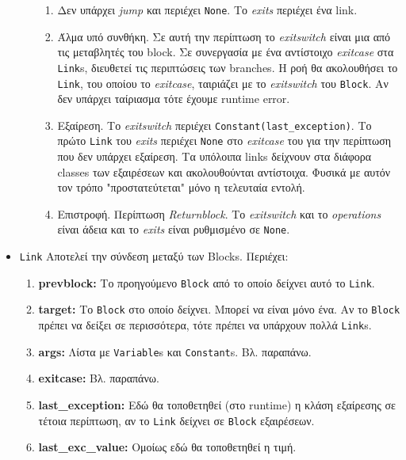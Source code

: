 \begin{itemize}
\begin{enumerate}
\begin{enumerate}
\item Δεν υπάρχει \textit{jump} και περιέχει \texttt{None}. Το \textit{exits}
περιέχει ένα link.
\item Άλμα υπό συνθήκη. Σε αυτή την περίπτωση το \textit{exitswitch} είναι μια
από τις μεταβλητές του block. Σε συνεργασία με ένα αντίστοιχο
\textit{exitcase} στα \texttt{Link}s, διευθετεί τις περιπτώσεις των branches.
Η ροή θα ακολουθήσει το \texttt{Link}, του οποίου το \textit{exitcase},
ταιριάζει με το \textit{exitswitch} του \texttt{Block}. Αν δεν υπάρχει 
ταίριασμα τότε έχουμε runtime error.
\item Εξαίρεση. Το \textit{exitswitch} περιέχει
\texttt{Constant(last\_exception)}. Το πρώτο \texttt{Link} του \textit{exits}
περιέχει \texttt{None} στο \textit{exitcase} του για την περίπτωση που δεν
υπάρχει εξαίρεση. Τα υπόλοιπα links δείχνουν στα διάφορα classes των εξαιρέσεων
και ακολουθούνται αντίστοιχα. Φυσικά με αυτόν τον τρόπο "προστατεύτεται" μόνο η
τελευταία εντολή.
\item Επιστροφή. Περίπτωση \textit{Returnblock}. Το \textit{exitswitch}
και το \textit{operations} είναι άδεια και το \textit{exits} είναι ρυθμισμένο 
σε \texttt{None}.
\end{enumerate}

\end{enumerate}

\item \texttt{Link} Αποτελεί την σύνδεση μεταξύ των Blocks. Περιέχει:

\begin{enumerate}
\item \textbf{prevblock:} Το προηγούμενο \texttt{Block} από το οποίο δείχνει 
αυτό το \texttt{Link}.
\item \textbf{target:} Το \texttt{Block} στο οποίο δείχνει. Μπορεί να είναι 
μόνο ένα. Αν το \texttt{Block} πρέπει να δείξει σε περισσότερα, τότε πρέπει να 
υπάρχουν πολλά \texttt{Link}s.
\item \textbf{args:} Λίστα με \texttt{Variable}s και \texttt{Constant}s. Βλ. 
παραπάνω.
\item \textbf{exitcase:} Βλ. παραπάνω.
\item \textbf{last\_exception:} Εδώ θα τοποθετηθεί (στο runtime) η κλάση 
εξαίρεσης σε τέτοια περίπτωση, αν το \texttt{Link} δείχνει σε \texttt{Block} 
εξαιρέσεων.
\item \textbf{last\_exc\_value:} Ομοίως εδώ θα τοποθετηθεί η τιμή.
\end{enumerate}


\end{itemize}
